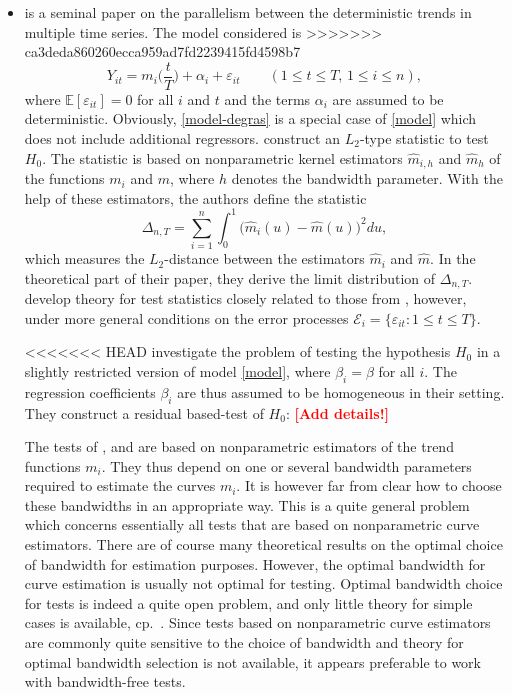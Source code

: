 \documentclass[a4paper,12pt]{article}
\begin{document}
\begin{itemize}[label=--,leftmargin=0.5cm]
\item \cite*{DegrasWu2012} is a seminal paper on the parallelism between the deterministic trends in multiple time series. The model considered is 
>>>>>>> ca3deda860260ecca959ad7fd2239415fd4598b7
\begin{equation}\label{model-degras}
Y_{it} = m_i \Big( \frac{t}{T} \Big) + \alpha_i + \varepsilon_{it} \qquad (1 \le t \le T, \, 1 \le i \le n), 
\end{equation}
where $\mathbb{E}[\varepsilon_{it}] = 0$ for all $i$ and $t$ and the terms $\alpha_i$ are assumed to be deterministic. Obviously, \eqref{model-degras} is a special case of \eqref{model} which does not include additional regressors. \cite{DegrasWu2012} construct an $L_2$-type statistic to test $H_0$. The statistic is based on nonparametric kernel estimators $\hat{m}_{i,h}$ and $\hat{m}_h$ of the functions $m_i$ and $m$, where $h$ denotes the bandwidth parameter. With the help of these estimators, the authors define the statistic
\[ \Delta_{n,T} = \sum_{i=1}^n \int_0^1 \big(\hat{m}_i(u) - \hat{m}(u)\big)^2 du, \] 
which measures the $L_2$-distance between the estimators $\hat{m}_i$ and $\hat{m}$. In the theoretical part of their paper, they derive the limit distribution of $\Delta_{n,T}$. 
\cite{ChenWu2018} develop theory for test statistics closely related to those from \cite{DegrasWu2012}, however, under more general conditions on the error processes $\mathcal{E}_i = \{ \varepsilon_{it}: 1 \le t \le T \}$. 


<<<<<<< HEAD
\cite{Zhang2012} investigate the problem of testing the hypothesis $H_0$ in a slightly restricted version of model \eqref{model}, where $\beta_i = \beta$ for all $i$. The regression coefficients $\beta_i$ are thus assumed to be homogeneous in their setting. They construct a residual based-test of $H_0$: \textcolor{red}{\textbf{[Add details!]}}


The tests of \cite{Zhang2012}, \cite{DegrasWu2012} and \cite{ChenWu2018} are based on nonparametric estimators of the trend functions $m_i$. They thus depend on one or several bandwidth parameters required to estimate the curves $m_i$. It is however far from clear how to choose these bandwidths in an appropriate way. This is a quite general problem which concerns essentially all tests that are based on nonparametric curve estimators. There are of course many theoretical results on the optimal choice of bandwidth for estimation purposes. However, the optimal bandwidth for curve estimation is usually not optimal for testing. Optimal bandwidth choice for tests is indeed a quite open problem, and only little theory for simple cases is available, cp.\ \cite{GaoGijbels2008}. Since tests based on nonparametric curve estimators are commonly quite sensitive to the choice of bandwidth and theory for optimal bandwidth selection is not available, it appears preferable to work with bandwidth-free tests. 



\end{itemize}
\end{document}
